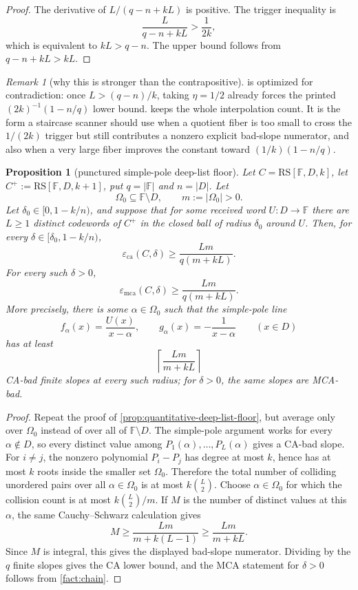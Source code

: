 \documentclass[11pt]{article}
\newtheorem{proposition}[theorem]{Proposition}
\theoremstyle{definition}
\theoremstyle{remark}
\newtheorem{remark}[theorem]{Remark}
\newcommand{\F}{\mathbb{F}}
\newcommand{\RS}{\mathrm{RS}}
\newcommand{\eca}{\varepsilon_{\mathrm{ca}}}
\newcommand{\emca}{\varepsilon_{\mathrm{mca}}}
\begin{document}
\begin{proof}
The derivative of $L/(q-n+kL)$ is positive.  The trigger inequality is
\[
        \frac{L}{q-n+kL}>\frac1{2k},
\]
which is equivalent to $kL>q-n$.  The upper bound follows from
$q-n+kL>kL$.
\end{proof}

\begin{remark}[why this is stronger than the contrapositive]
\label{rem:quantitative-floor-vs-contrapositive}
 is optimized for contradiction: once $L>(q-n)/k$, taking
$\eta=1/2$ already forces the printed $(2k)^{-1}(1-n/q)$ lower bound.
 keeps the whole interpolation count.
It is the form a staircase scanner should use when a quotient fiber is too small
to cross the $1/(2k)$ trigger but still contributes a nonzero explicit bad-slope
numerator, and also when a very large fiber improves the constant toward
$(1/k)(1-n/q)$.
\end{remark}

\begin{proposition}[punctured simple-pole deep-list floor]
\label{prop:punctured-simple-pole-floor}
Let $C=\RS[\F,D,k]$, let $C^+:=\RS[\F,D,k+1]$, put
$q=|\F|$ and $n=|D|$.  Let
\[
        \Omega_0\subseteq \F\setminus D,
        \qquad m:=|\Omega_0|>0 .
\]
Let $\delta_0\in[0,1-k/n)$, and suppose that for some received word
$U:D\to\F$ there are $L\ge1$ distinct codewords of $C^+$ in the closed ball of
radius $\delta_0$ around $U$.  Then, for every
$\delta\in[\delta_0,1-k/n)$,
\[
        \eca(C,\delta)
        \ge
        \frac{Lm}{q(m+kL)} .
\]
For every such $\delta>0$,
\[
        \emca(C,\delta)
        \ge
        \frac{Lm}{q(m+kL)} .
\]
More precisely, there is some $\alpha\in\Omega_0$ such that the simple-pole line
\[
        f_\alpha(x)=\frac{U(x)}{x-\alpha},
        \qquad
        g_\alpha(x)=-\frac1{x-\alpha}
        \qquad (x\in D)
\]
has at least
\[
        \left\lceil\frac{Lm}{m+kL}\right\rceil
\]
CA-bad finite slopes at every such radius; for $\delta>0$, the same slopes are
MCA-bad.
\end{proposition}

\begin{proof}
Repeat the proof of \cref{prop:quantitative-deep-list-floor}, but average only
over $\Omega_0$ instead of over all of $\F\setminus D$.  The simple-pole
argument works for every $\alpha\notin D$, so every distinct value among
$P_1(\alpha),\ldots,P_L(\alpha)$ gives a CA-bad slope.  For $i\ne j$, the
nonzero polynomial $P_i-P_j$ has degree at most $k$, hence has at most $k$ roots
inside the smaller set $\Omega_0$.  Therefore the total number of colliding
unordered pairs over all $\alpha\in\Omega_0$ is at most $k\binom L2$.  Choose
$\alpha\in\Omega_0$ for which the collision count is at most
$k\binom L2/m$.  If $M$ is the number of distinct values at this $\alpha$, the
same Cauchy--Schwarz calculation gives
\[
        M\ge
        \frac{Lm}{m+k(L-1)}
        \ge
        \frac{Lm}{m+kL} .
\]
Since $M$ is integral, this gives the displayed bad-slope numerator.  Dividing
by the $q$ finite slopes gives the CA lower bound, and the MCA statement for
$\delta>0$ follows from \cref{fact:chain}.
\end{proof}
\end{document}
